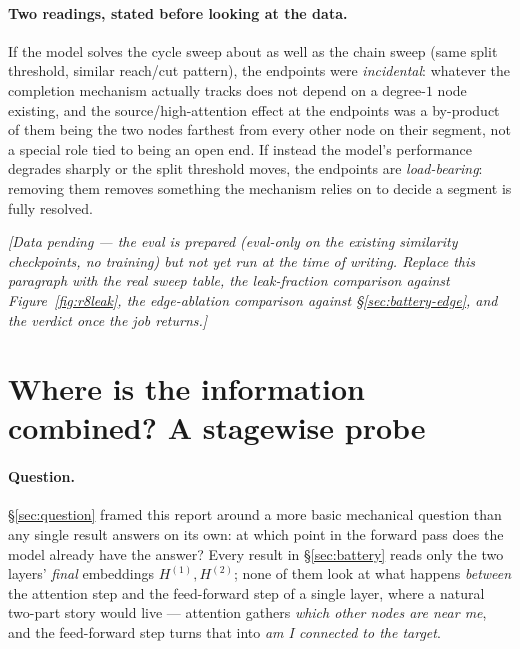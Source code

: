 \documentclass[11pt,a4paper]{article}
\begin{document}
\paragraph{Two readings, stated before looking at the data.} If the model
solves the cycle sweep about as well as the chain sweep (same split
threshold, similar reach/cut pattern), the endpoints were \emph{incidental}:
whatever the completion mechanism actually tracks does not depend on a
degree-$1$ node existing, and the source/high-attention effect at the
endpoints was a by-product of them being the two nodes farthest from every
other node on their segment, not a special role tied to being an open end.
If instead the model's performance degrades sharply or the split threshold
moves, the endpoints are \emph{load-bearing}: removing them removes
something the mechanism relies on to decide a segment is fully resolved.

\emph{[Data pending --- the eval is prepared (eval-only on the existing
similarity checkpoints, no training) but not yet run at the time of writing.
Replace this paragraph with the real sweep table, the leak-fraction
comparison against Figure~\ref{fig:r8leak}, the edge-ablation comparison
against \S\ref{sec:battery-edge}, and the verdict once the job returns.]}

\section{Where is the information combined? A stagewise probe}
\label{sec:stagewise}

\paragraph{Question.} \S\ref{sec:question} framed this report around a more
basic mechanical question than any single result answers on its own: at which
point in the forward pass does the model already have the answer? Every
result in \S\ref{sec:battery} reads only the two layers' \emph{final}
embeddings $H^{(1)},H^{(2)}$; none of them look at what happens
\emph{between} the attention step and the feed-forward step of a single
layer, where a natural two-part story would live --- attention gathers
\emph{which other nodes are near me}, and the feed-forward step turns that
into \emph{am I connected to the target}.
\end{document}
